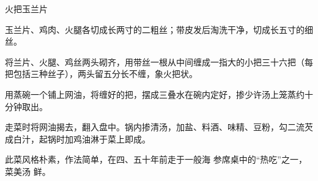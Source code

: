 \begin{recipe}{火把玉兰片}

\ingredients


\preparation

\step 玉兰片、鸡肉、火腿各切成长两寸的二粗丝；带皮发后淘洗干净，切成长五寸的细
丝。

\step 将兰片、火腿、鸡丝两头砌齐，用带丝一根从中间缠成一指大的小把三十六把（每
把包括三种丝子），两头留五分长不缠，象火把状。

\step 用蒸碗一个铺上网油，将缠好的把，摆成三叠水在碗内定好，掺少许汤上笼蒸约十
分钟取出。

\step 走菜时将网油揭去，翻入盘中。锅内掺清汤，加盐、料酒、味精、豆粉，勾二流芡
成白汁，起锅时加鸡油淋于菜上即成。

\features

此菜风格朴素，作法简单，在四、五十年前走于一般海 参席桌中的“热吃”之一，菜美汤
鲜。

\end{recipe}

